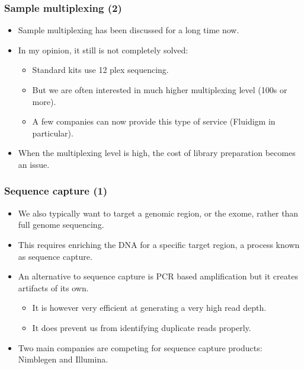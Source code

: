 \documentclass{beamer}
\begin{document}
\begin{frame}
  \frametitle{Sample multiplexing (2)}
  \begin{itemize}
  \item Sample multiplexing has been discussed for a long time now.
  \item In my opinion, it still is not completely solved:
    \begin{itemize}
    \item Standard kits use 12 plex sequencing.
    \item But we are often interested in much higher multiplexing level (100s or more).
    \item A few companies can now provide this type of service (Fluidigm in particular).
    \end{itemize}
  \item When the multiplexing level is high, the cost of library preparation becomes an issue.
  \end{itemize}
\end{frame}


\begin{frame}
  \frametitle{Sequence capture (1)}
  \begin{itemize}
  \item We also typically want to target a genomic region, or the exome, rather than full genome sequencing.
  \item This requires enriching the DNA for a specific target region, a process known as sequence capture.
  \item An alternative to sequence capture is PCR based amplification but it creates artifacts of its own.
    \begin{itemize}
    \item It is however very efficient at generating a very high read depth.
    \item It does prevent us from identifying duplicate reads properly.
    \end{itemize}
  \item Two main companies are competing for sequence capture products: Nimblegen and Illumina.
  \end{itemize}
\end{frame}
\end{document}
